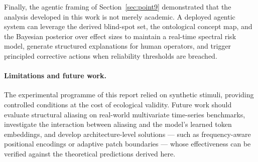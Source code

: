 Finally, the agentic framing of Section~\ref{sec:point9} demonstrated that the analysis developed in this work is not merely academic.
A deployed agentic system can leverage the derived blind-spot set, the ontological concept map, and the Bayesian posterior over effect sizes to maintain a real-time spectral risk model, generate structured explanations for human operators, and trigger principled corrective actions when reliability thresholds are breached.

\paragraph{Limitations and future work.}
The experimental programme of this report relied on synthetic stimuli, providing controlled conditions at the cost of ecological validity.
Future work should evaluate structural aliasing on real-world multivariate time-series benchmarks, investigate the interaction between aliasing and the model's learned token embeddings, and develop architecture-level solutions — such as frequency-aware positional encodings or adaptive patch boundaries — whose effectiveness can be verified against the theoretical predictions derived here.

